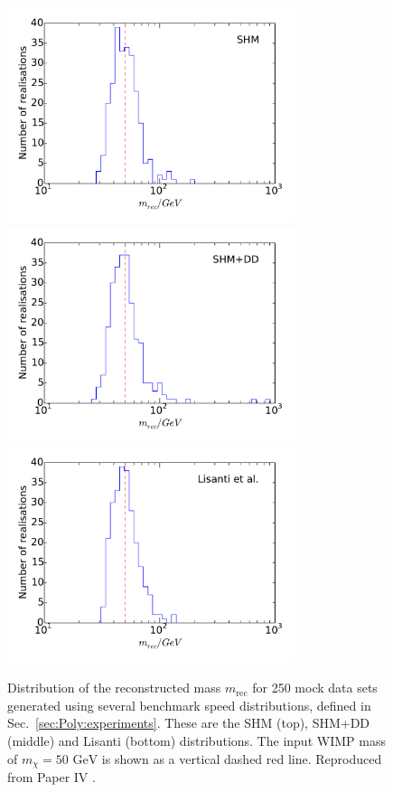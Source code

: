 \begin{figure}
\centering
  \includegraphics[trim=0cm 1cm 0cm 0.5cm,clip=true,width=0.75\textwidth]{Poly/SHM_ensemble.pdf}
  \includegraphics[trim=0cm 1cm 0cm 0.5cm,clip=true,width=0.75\textwidth]{Poly/DD_ensemble.pdf}
  \includegraphics[trim=0cm 1cm 0cm 0.5cm,clip=true,width=0.75\textwidth]{Poly/LIS_ensemble.pdf}
  \caption[Distribution of the reconstructed mass using a 50 GeV WIMP and SHM, SHM+DD and Lisanti \etal distribution functions]{Distribution of the reconstructed mass $m_\textrm{rec}$ for 250 mock data sets generated using several benchmark speed distributions, defined in Sec.~\ref{sec:Poly:experiments}. These are the SHM (top), SHM+DD (middle) and Lisanti \etal (bottom) distributions. The input WIMP mass of $m_\chi = 50 \textrm{ GeV}$ is shown as a vertical dashed red line. Reproduced from Paper IV \cite{Kavanagh:2014}.}
  \label{fig:Poly:Realisations}
\end{figure}

